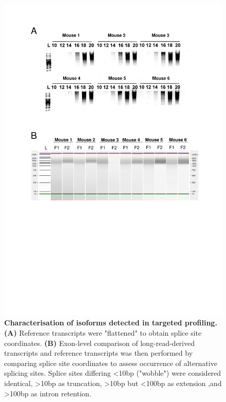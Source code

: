 \begin{figure}[htp]
	\centering
	\includegraphics[page=7,trim={0cm 3cm 0cm 0cm},clip,scale = 0.75]{Figures/TargetedTranscriptome_LabResults}
	\captionsetup{width=0.95\textwidth,singlelinecheck=off}
	\caption[Characterisation of isoforms detected in targeted profiling]%
	{\textbf{Characterisation of isoforms detected in targeted profiling.} \textbf{(A)} Reference transcripts were "flattened" to obtain splice site coordinates. \textbf{(B)} Exon-level comparison of long-read-derived transcripts and reference transcripts was then performed by comparing splice site coordinates to assess occurrence of alternative splicing sites. Splice sites differing <10bp ("wobble") were considered identical, >10bp as truncation, >10bp but <100bp as extension ,and >100bp as intron retention.  
	}
	\label{fig:Targeted_isoforms_annotate}
\end{figure}

